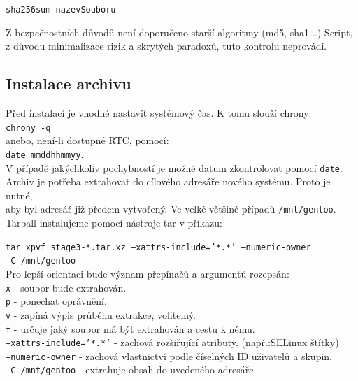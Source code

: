 \documentclass[12pt,a4paper,twoside,]{article}
\begin{document}
{{{{{{{\texttt{sha256sum nazevSouboru}

\hspace{-1.5em}Z bezpečnostních důvodů není doporučeno starší algoritmy (md5, sha1...)
Script, z důvodu minimalizace rizik a skrytých paradoxů, tuto kontrolu neprovádí. %
\newpage
\subsection{\textsf{Instalace archivu}}
Před instalací je vhodné nastavit systémový čas. K tomu slouží chrony:\\
\hspace*{1.5em}\texttt{chrony -q}\\
 anebo, není-li dostupné RTC, pomocí: \\ \hspace*{1.5em}\texttt{date mmddhhmmyy}.\\
 
V případě jakýchkoliv pochybností je možné datum zkontrolovat pomocí \texttt{date}.
\\Archiv je potřeba extrahovat do cílového adresáře nového systému. Proto je nutné,\\
aby byl adresář již předem vytvořený. Ve velké většině případů \texttt{/mnt/gentoo}.\\
Tarball instalujeme pomocí nástroje tar v příkazu:

\texttt{tar xpvf stage3-*.tar.xz --xattrs-include='*.*' --numeric-owner \\\hspace*{1.5em}-C /mnt/gentoo}\\

\hspace{-1.5em}Pro lepší orientaci bude význam přepínačů a argumentů rozepsán:\\

\texttt{x} - soubor bude extrahován.\\
\hspace*{1.5em}\texttt{p} - ponechat oprávnění. \\
\hspace*{1.5em}\texttt{v} - zapíná výpis průběhu extrakce, volitelný.\\
\hspace*{1.5em}\texttt{f} - určuje jaký soubor má být extrahován a cestu k němu.\\
\hspace*{1.5em}\texttt{--xattrs-include='*.*'} - zachová rozšiřující atributy.
(např.:SELinux štítky)\\
\hspace*{1.5em}\texttt{--numeric-owner} - zachová vlastnictví podle číselných ID uživatelů a
skupin.\\
\hspace*{1.5em}\texttt{-C /mnt/gentoo} - extrahuje obsah do uvedeného adresáře.\\



}}}}}}}
\end{document}
